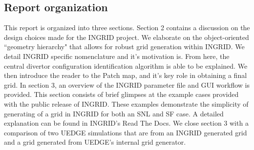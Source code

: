 \subsection{\label{sec:level2}Report organization}
This report is organized into three sections. Section 2 contains a discussion on the design choices made for the INGRID project. We elaborate on the object-oriented ``geometry hierarchy" that allows for robust grid generation within INGRID. We detail INGRID specific nomenclature and it's motivation is. From here, the central divertor configuration identification algorithm is able to be explained. We then introduce the reader to the Patch map, and it's key role in obtaining a final grid.
In section 3, an overview of the INGRID parameter file and GUI workflow is provided. This section consists of brief glimpses at the example cases provided with the public release of INGRID. These examples demonstrate the simplicity of generating of a grid in INGRID for both an SNL and SF case. A detailed explanation can be found in INGRID's Read The Docs. We close section 3 with a comparison of two UEDGE simulations that are from an INGRID generated grid and a grid generated from UEDGE's internal grid generator.